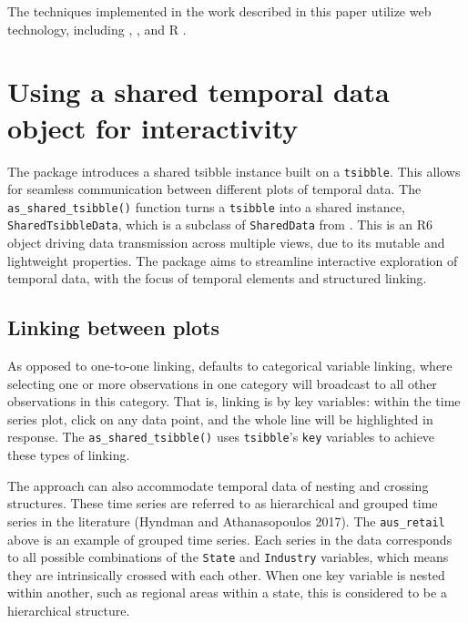 The techniques implemented in the work described in this paper utilize web technology, including , , and R .

\hypertarget{using-a-shared-temporal-data-object-for-interactivity}{%
\section{Using a shared temporal data object for interactivity}\label{using-a-shared-temporal-data-object-for-interactivity}}

The  package introduces a shared tsibble instance built on a \texttt{tsibble}. This allows for seamless communication between different plots of temporal data. The \texttt{as\_shared\_tsibble()} function turns a \texttt{tsibble} into a shared instance, \texttt{SharedTsibbleData}, which is a subclass of \texttt{SharedData} from . This is an R6 object driving data transmission across multiple views, due to its mutable and lightweight properties. The  package aims to streamline interactive exploration of temporal data, with the focus of temporal elements and structured linking.

\hypertarget{linking-between-plots}{%
\subsection{Linking between plots}\label{linking-between-plots}}

As opposed to one-to-one linking,  defaults to categorical variable linking, where selecting one or more observations in one category will broadcast to all other observations in this category. That is, linking is by key variables: within the time series plot, click on any data point, and the whole line will be highlighted in response. The \texttt{as\_shared\_tsibble()} uses \texttt{tsibble}'s \texttt{key} variables to achieve these types of linking.

The approach can also accommodate temporal data of nesting and crossing structures. These time series are referred to as hierarchical and grouped time series in the literature (Hyndman and Athanasopoulos 2017). The \texttt{aus\_retail} above is an example of grouped time series. Each series in the data corresponds to all possible combinations of the \texttt{State} and \texttt{Industry} variables, which means they are intrinsically crossed with each other. When one key variable is nested within another, such as regional areas within a state, this is considered to be a hierarchical structure.

